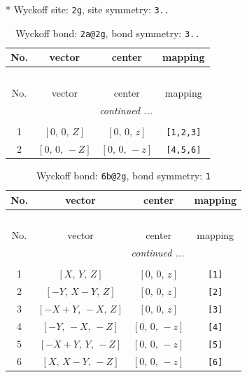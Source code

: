 \documentclass[fleqn,8pt]{jsarticle}
\begin{document}
* Wyckoff site: {\tt 2g}, site symmetry: {\tt 3..}
\renewcommand{\arraystretch}{1.2}
\begin{longtable}{cccc}
\caption{Wyckoff bond: {\tt 2a@2g}, bond symmetry: {\tt 3..}}
 \\
 \hline \hline
No. & vector & center & mapping \\ \hline \endfirsthead

\multicolumn{3}{l}{\tablename\ \thetable{}} \\
 \hline \hline
No. & vector & center & mapping \\ \hline \endhead

 \hline \hline
\multicolumn{3}{r}{\footnotesize\it continued ...} \\ \endfoot

 \hline \hline
\multicolumn{3}{r}{} \\ \endlastfoot

1 & $\left[ 0,\, 0,\, Z \right]$ & $\left[ 0,\, 0,\, z \right]$ & {\tt [1,2,3]} \\ \hline
2 & $\left[ 0,\, 0,\, - Z \right]$ & $\left[ 0,\, 0,\, - z \right]$ & {\tt [4,5,6]} \\
\end{longtable}
\renewcommand{\arraystretch}{1.2}
\begin{longtable}{cccc}
\caption{Wyckoff bond: {\tt 6b@2g}, bond symmetry: {\tt 1}}
 \\
 \hline \hline
No. & vector & center & mapping \\ \hline \endfirsthead

\multicolumn{3}{l}{\tablename\ \thetable{}} \\
 \hline \hline
No. & vector & center & mapping \\ \hline \endhead

 \hline \hline
\multicolumn{3}{r}{\footnotesize\it continued ...} \\ \endfoot

 \hline \hline
\multicolumn{3}{r}{} \\ \endlastfoot

1 & $\left[ X,\, Y,\, Z \right]$ & $\left[ 0,\, 0,\, z \right]$ & {\tt [1]} \\ \hline
2 & $\left[ - Y,\, X - Y,\, Z \right]$ & $\left[ 0,\, 0,\, z \right]$ & {\tt [2]} \\ \hline
3 & $\left[ - X + Y,\, - X,\, Z \right]$ & $\left[ 0,\, 0,\, z \right]$ & {\tt [3]} \\ \hline
4 & $\left[ - Y,\, - X,\, - Z \right]$ & $\left[ 0,\, 0,\, - z \right]$ & {\tt [4]} \\ \hline
5 & $\left[ - X + Y,\, Y,\, - Z \right]$ & $\left[ 0,\, 0,\, - z \right]$ & {\tt [5]} \\ \hline
6 & $\left[ X,\, X - Y,\, - Z \right]$ & $\left[ 0,\, 0,\, - z \right]$ & {\tt [6]} \\
\end{longtable}
\end{document}
